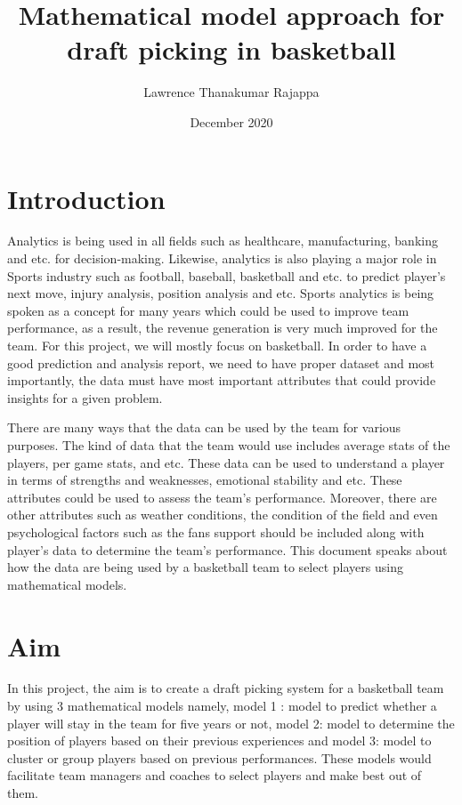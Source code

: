 \documentclass[format=sigconf]{acmart}
\title{Mathematical model approach for draft picking in basketball}
\author{Lawrence Thanakumar Rajappa}
\affiliation{\institution{IDA Linköping University}}
\date{December 2020}
\begin{document}
\maketitle
\pagestyle{plain} %

\section{Introduction}
Analytics is being used in all fields such as healthcare, manufacturing, banking and etc. for decision-making. Likewise, 
analytics is also playing a major role in Sports industry such as football, baseball, basketball and etc. to predict player's 
next move, injury analysis, position analysis and etc. Sports analytics is being spoken as a concept for many years which 
could be used to improve team performance, as a result, the revenue generation is very much improved for the team. For this 
project, we will mostly focus on basketball. In order to have a good prediction and analysis report, we need to have proper
dataset and most importantly, the data must have most important attributes that could provide insights for a given problem.

There are many ways that the data can be used by the team for various purposes. The kind of data that the team would use includes
average stats of the players, per game stats, and etc. These data can be used to understand a player in terms of strengths and 
weaknesses, emotional stability and etc. These attributes could be used to assess the team's performance. Moreover, there are other 
attributes such as weather conditions, the condition of the field and even psychological factors such as the fans support should be
included along with player's data to determine the team's performance. This document speaks about how the data are being used by
a basketball team to select players using mathematical models.

\section{Aim}
In this project, the aim is to create a draft picking system for a basketball team by using 3 mathematical models namely, model 1 : model
to predict whether a player will stay in the team for five years or not, model 2: model to determine the position of players 
based on their previous experiences and model 3: model to cluster or group players based on previous performances. These models
would facilitate team managers and coaches to select players and make best out of them.
\end{document}
